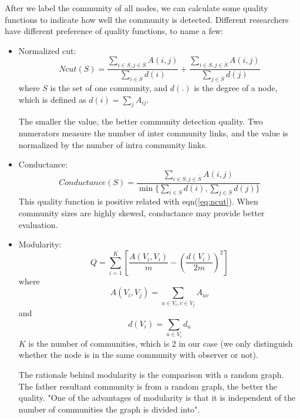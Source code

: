 \documentclass[11pt,a4paper]{article}
\begin{document}
After we label the community of all nodes, we can calculate some quality 
functions to indicate how well the community is detected. Different researchers
have different preference of quality functions, to name a few:
	\begin{itemize}
		\item Normalized cut:
		\begin{equation}
			Ncut(S)=\frac{\sum_{i \in S, j \in \overline{S}}{A(i,j)}}
			{\sum_{i \in S}{d(i)}}
			+ \frac{\sum_{i \in S, j \in \overline{S}}{A(i,j)}}
			{\sum_{j \in \overline{S}}{d(j)}}					
			\label{eq:ncut}	
		\end{equation}
		where $S$ is the set of one community, 
		and $d(.)$ is the degree of a node, which is defined as 
		$d(i)=\sum_j{A_{ij}}$.
		
		The smaller the value, the better community detection quality. 
		Two numerators measure the number of inter community links, 
		and the value is normalized by the number of intra community links. 
		\item Conductance:
		\begin{equation}
			Conductance(S)=\frac{\sum_{i \in S, j \in \overline{S}}{A(i,j)}}
			{\min \{ \sum_{i \in S}{d(i)}, \sum_{j \in \overline{S}}{d(j)}\}}	
			\label{eq:conductance}			
		\end{equation}
		This quality function is positive related with eqn(\ref{eq:ncut}). 
		When community sizes are highly skewed, conductance may provide 
		better evaluation. 
		\item Modularity:
		\begin{equation}
			Q=\sum_{i=1}^{K}{\left[ 
			\frac{A(V_i,V_i)}{m} 
			-\left( \frac{d(V_i)}{2m}\right)^2
			\right]}
			\label{eq:modularity}
		\end{equation}
		where 
		\begin{equation}
			A(V_i,V_j)= \sum_{u \in V_i,v \in V_j}{A_{uv}}
		\end{equation}
		and 
		\begin{equation}
			d(V_i)=\sum_{u \in V_i}{d_u}
		\end{equation}
		$K$ is the number of communities, which is 2 in our case
		(we only distinguish whether the node is in the same community
		with observer or not).
		
		The rationale behind modularity is the comparison with a random 
		graph. The father resultant community is from a random graph, 
		the better the quality. "One of the advantages of modularity is 
		that it is independent of the number of communities the graph is
		divided into"\cite{aggarwal2011social}. 
	\end{itemize}
	
\end{document}
